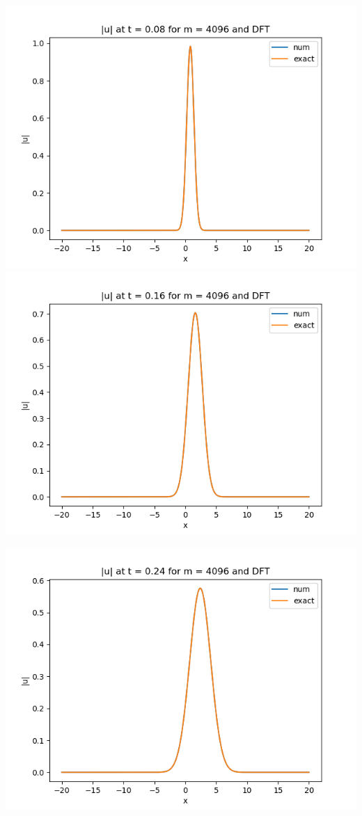 \documentclass{article}
\begin{document}
\begin{enumerate}[label=(\alph*)]
\begin{center}
	\includegraphics[scale=.3]{FINAL u_abs t = 0.08 m = 4096 DFT}
	\includegraphics[scale=.3]{FINAL u_abs t = 0.16 m = 4096 DFT}
\end{center}
\begin{center}
	\includegraphics[scale=.3]{FINAL u_abs t = 0.24 m = 4096 DFT}

\end{center}
\end{enumerate}
\end{document}

